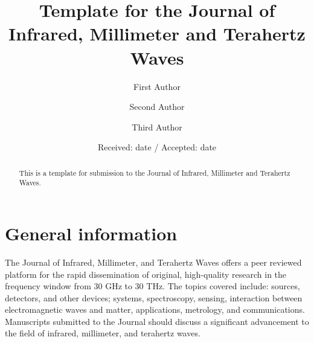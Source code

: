 \documentclass[smallextended]{svjour3}
\begin{document}
\title{Template for the Journal of Infrared, Millimeter and Terahertz Waves}

\author{First Author \and
	Second Author \and
	Third Author
}


\date{Received: date / Accepted: date}

\maketitle

\begin{abstract}
This is a template for submission to the Journal of Infrared, Millimeter and Terahertz Waves.


\end{abstract}

\section{General information}
The Journal of Infrared, Millimeter, and Terahertz Waves\cite{button1980editorial} offers a peer reviewed platform for the rapid dissemination of original, high-quality research in the frequency window from 30 GHz to 30 THz. The topics covered include: sources, detectors, and other devices; systems, spectroscopy, sensing, interaction between electromagnetic waves and matter, applications, metrology, and communications. Manuscripts submitted to the Journal should discuss a significant advancement to the field of infrared, millimeter, and terahertz waves.
\end{document}

